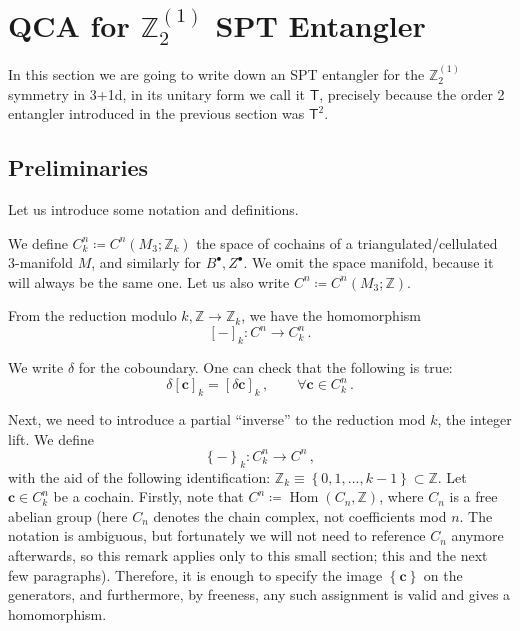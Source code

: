 \documentclass[aps,twocolumn,prx,floatfix,preprintnumbers, nofootinbib,10pt]{revtex4-2}
\numberwithin{equation}{section}
\theoremstyle{definition}
\theoremstyle{remark}
\theoremstyle{claim}
\newcommand{\be}{\begin{equation}}
\newcommand{\ee}{\end{equation}}
\newcommand{\lbb}{\left[}
\newcommand{\rbb}{\right]}
\newcommand{\lbbb}{\left\{}
\newcommand{\rbbb}{\right\}}
\newcommand{\Z}{{\mathbb Z}}
\renewcommand{\sf}[1]{\mathsf{#1}}
\begin{document}
\section{QCA for $\Z_2^{(1)}$ SPT Entangler}\label{sec:qca_for_root_entangler}

In this section we are going to write down an SPT entangler for the $\Z_2^{(1)}$ symmetry in 3+1d, in its unitary form we call it $\sf{T}$, precisely because the order 2 entangler introduced in the previous section was $\sf{T}^2$.

\subsection{Preliminaries}

Let us introduce some notation and definitions.

We define $C^n_k \coloneqq C^n(M_3; \Z_k)$ the space of cochains of a triangulated/cellulated 3-manifold $M$, and similarly for $B^\bullet, Z^\bullet$. We omit the space manifold, because it will always be the same one. Let us also write $C^n \coloneqq C^n(M_3; \Z)$.

From the reduction modulo $k, \Z \rightarrow \Z_k$, we have the homomorphism
\be
\lbb - \rbb_k : C^n \rightarrow C^n_k \,.
\ee

We write $\delta$ for the coboundary. One can check that the following is true:
\be
\delta \lbb \bm{c} \rbb_k = \lbb \delta \bm{c} \rbb_k \,, \qquad \forall \bm{c} \in C^n_k \,.
\ee

Next, we need to introduce a partial ``inverse'' to the reduction mod $k$, the integer lift. We define
\be
\lbbb - \rbbb_k : C^n_k \rightarrow C^n \,,
\ee
with the aid of the following identification: $\Z_k \equiv \lbbb 0, 1, ..., k - 1 \rbbb \subset \Z$. Let $\bm{c} \in C^n_k$ be a cochain. Firstly, note that $C^n \coloneqq \operatorname{Hom}(C_n, \Z)$, where $C_n$ is a free abelian group (here $C_n$ denotes the chain complex, not coefficients mod $n$. The notation is ambiguous, but fortunately we will not need to reference $C_n$ anymore afterwards, so this remark applies only to this small section; this and the next few paragraphs). Therefore, it is enough to specify the image $\lbbb \bm{c} \rbbb$ on the generators, and furthermore, by freeness, any such assignment is valid and gives a homomorphism.
\end{document}
